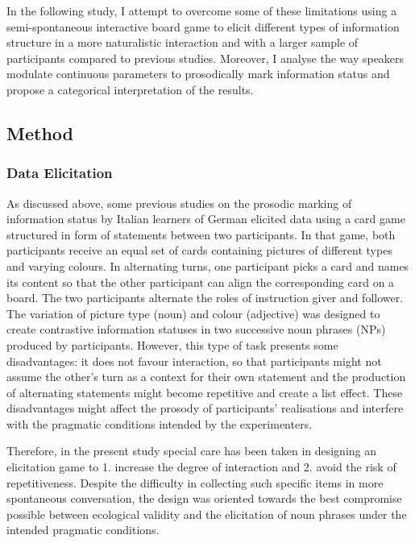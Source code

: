 \begin{styleStandard}
In the following study, I attempt to overcome some of these limitations using a semi-spontaneous interactive board game to elicit different types of information structure in a more naturalistic interaction and with a larger sample of participants compared to previous studies. Moreover, I analyse the way speakers modulate continuous parameters to prosodically mark information status and propose a categorical interpretation of the results.
\end{styleStandard}

\subsection{Method}
\hypertarget{Toc191305891}{}\subsubsection{Data Elicitation}
\hypertarget{Toc191305892}{}\begin{styleStandard}
As discussed above, some previous studies on the prosodic marking of information status by Italian learners of German elicited data using a card game structured in form of statements between two participants. In that game, both participants receive an equal set of cards containing pictures of different types and varying colours. In alternating turns, one participant picks a card and names its content so that the other participant can align the corresponding card on a board. The two participants alternate the roles of instruction giver and follower. The variation of picture type (noun) and colour (adjective) was designed to create contrastive information statuses in two successive noun phrases (NPs) produced by participants. However, this type of task presents some disadvantages: it does not favour interaction, so that participants might not assume the other’s turn as a context for their own statement and the production of alternating statements might become repetitive and create a list effect. These disadvantages might affect the prosody of participants’ realisations and interfere with the pragmatic conditions intended by the experimenters.
\end{styleStandard}

\begin{styleStandard}
Therefore, in the present study special care has been taken in designing an elicitation game to 1. increase the degree of interaction and 2. avoid the risk of repetitiveness. Despite the difficulty in collecting such specific items in more spontaneous conversation, the design was oriented towards the best compromise possible between ecological validity and the elicitation of noun phrases under the intended pragmatic conditions.
\end{styleStandard}

